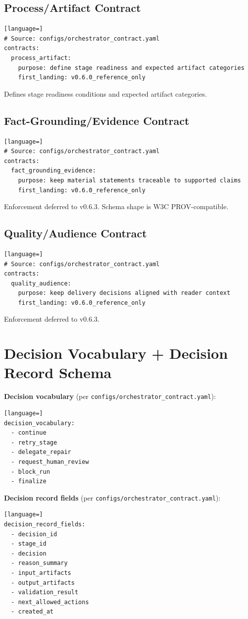 \documentclass[11pt,a4paper]{article}
\begin{document}
\subsection{Process/Artifact Contract}
\begin{lstlisting}[language=]
# Source: configs/orchestrator_contract.yaml
contracts:
  process_artifact:
    purpose: define stage readiness and expected artifact categories
    first_landing: v0.6.0_reference_only
\end{lstlisting}
Defines stage readiness conditions and expected artifact categories.

\subsection{Fact-Grounding/Evidence Contract}
\begin{lstlisting}[language=]
# Source: configs/orchestrator_contract.yaml
contracts:
  fact_grounding_evidence:
    purpose: keep material statements traceable to supported claims
    first_landing: v0.6.0_reference_only
\end{lstlisting}
Enforcement deferred to v0.6.3. Schema shape is W3C PROV-compatible.

\subsection{Quality/Audience Contract}
\begin{lstlisting}[language=]
# Source: configs/orchestrator_contract.yaml
contracts:
  quality_audience:
    purpose: keep delivery decisions aligned with reader context
    first_landing: v0.6.0_reference_only
\end{lstlisting}
Enforcement deferred to v0.6.3.

\section{Decision Vocabulary + Decision Record Schema}

\textbf{Decision vocabulary} (per \texttt{configs/orchestrator\_contract.yaml}):
\begin{lstlisting}[language=]
decision_vocabulary:
  - continue
  - retry_stage
  - delegate_repair
  - request_human_review
  - block_run
  - finalize
\end{lstlisting}

\textbf{Decision record fields} (per \texttt{configs/orchestrator\_contract.yaml}):
\begin{lstlisting}[language=]
decision_record_fields:
  - decision_id
  - stage_id
  - decision
  - reason_summary
  - input_artifacts
  - output_artifacts
  - validation_result
  - next_allowed_actions
  - created_at
\end{lstlisting}
\end{document}
